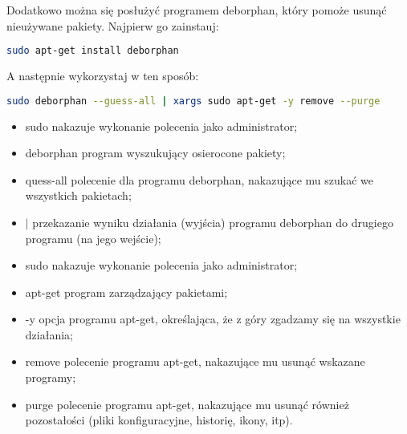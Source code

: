 Dodatkowo można się posłużyć programem \textcolor{ubuntu_orange}{deborphan}, który pomoże usunąć nieużywane pakiety. Najpierw go zainstauj:
\begin{lstlisting}[language=bash]
sudo apt-get install deborphan
\end{lstlisting}
A następnie wykorzystaj w ten sposób:
\begin{lstlisting}[language=bash]
sudo deborphan --guess-all | xargs sudo apt-get -y remove --purge
\end{lstlisting}
\begin{itemize}
\item \textcolor{ubuntu_orange}{sudo} nakazuje wykonanie polecenia jako administrator;
\item \textcolor{ubuntu_orange}{deborphan} program wyszukujący osierocone pakiety;
\item \textcolor{ubuntu_orange}{\-\-quess-all} polecenie dla programu deborphan, nakazujące mu szukać we wszystkich pakietach;
\item \textcolor{ubuntu_orange}{$\vert$} przekazanie wyniku działania (wyjścia) programu deborphan do drugiego programu (na jego wejście);
\item \textcolor{ubuntu_orange}{sudo} nakazuje wykonanie polecenia jako administrator;
\item \textcolor{ubuntu_orange}{apt-get} program zarządzający pakietami;
\item \textcolor{ubuntu_orange}{-y} opcja programu apt-get, określająca, że z góry zgadzamy się na wszystkie działania;
\item \textcolor{ubuntu_orange}{remove} polecenie programu apt-get, nakazujące mu usunąć wskazane programy;
\item \textcolor{ubuntu_orange}{\-\-purge} polecenie programu apt-get, nakazujące mu usunąć również pozostałości (pliki konfiguracyjne, historię, ikony, itp).
\end{itemize}
